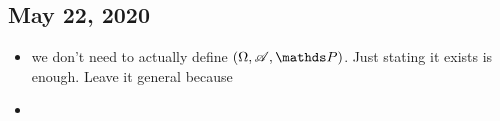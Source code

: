 \subsection{May 22, 2020}

\begin{itemize}
	\item we don't need to actually define $(\Om, \Ac, \Pb)$. Just stating it exists is enough. Leave it general because 
	\item 
\end{itemize}




























